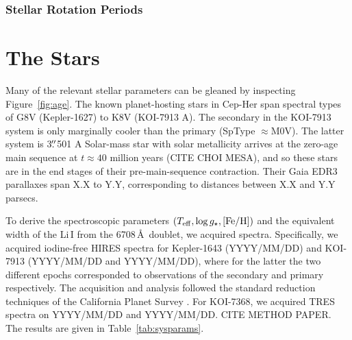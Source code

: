 \documentclass[12pt,twocolumn,linenumbers]{aastex63}
\begin{document}

\subsubsection{Stellar Rotation Periods}

\section{The Stars}
\label{sec:stars}



Many of the relevant stellar parameters can be gleaned by inspecting
Figure~\ref{fig:age}.  The known planet-hosting stars in Cep-Her span
spectral types of G8V (Kepler-1627) to K8V (KOI-7913 A).  The
secondary in the KOI-7913 system is only marginally cooler than the
primary (SpType $\approx$M0V).
The latter system is 3$\mbox{$.\!\!^{\prime\prime}$}$501 
A Solar-mass star with solar metallicity arrives at the zero-age main
sequence at $t\approx40$ million years (CITE CHOI MESA), and so these
stars are in the end stages of their pre-main-sequence contraction.
Their Gaia EDR3 parallaxes span X.X to Y.Y, corresponding to distances
between X.X and Y.Y parsecs.

To derive the spectroscopic parameters $(T_{\rm eff}, \log g_\star,
[{\rm Fe/H}])$ and  the equivalent width of the Li\,\textsc{I}
from the 6708\,\AA\ doublet, we acquired spectra.  Specifically, we
acquired iodine-free HIRES spectra for Kepler-1643 (YYYY/MM/DD) and
KOI-7913 (YYYY/MM/DD and YYYY/MM/DD), where for the latter the two
different epochs corresponded to observations of the secondary and
primary respectively.  The acquisition and analysis followed the
standard reduction techniques of the California Planet Survey
\citep{howard_cps_2010}.  For KOI-7368, we acquired TRES spectra on
YYYY/MM/DD and YYYY/MM/DD.  CITE METHOD PAPER.
The results are given in Table~\ref{tab:sysparams}.
\end{document}
